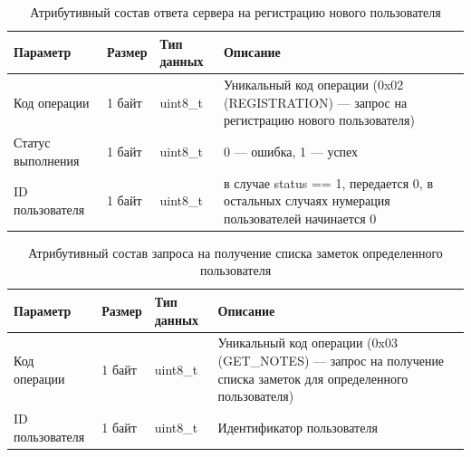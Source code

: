 \begin{table}[H]
    \centering
    \caption{Атрибутивный состав ответа сервера на регистрацию нового пользователя}
    \renewcommand{\arraystretch}{1.2}
    \begin{tabular}{|p{4cm}|p{2.2cm}|p{3cm}|p{6cm}|}
    \hline
    \textbf{Параметр} & \textbf{Размер} & \textbf{Тип данных} & \textbf{Описание} \\ \hline
    Код операции & 1 байт & uint8\_t & Уникальный код операции (0x02 (REGISTRATION) — запрос на регистрацию нового пользователя) \\ \hline
    Статус выполнения & 1 байт & uint8\_t & 0 — ошибка, 1 — успех \\ \hline
    ID пользователя & 1 байт & uint8\_t & в случае status == 1, передается 0, в остальных случаях нумерация пользователей начинается 0 \\ \hline
    \end{tabular}
    \label{tab:auth_response}
\end{table}



\begin{table}[H]
    \centering
    \caption{Атрибутивный состав запроса на получение списка заметок определенного пользователя}
    \begin{tabular}{|p{4cm}|p{2cm}|p{3cm}|p{6cm}|}
    \hline
    \textbf{Параметр} & \textbf{Размер} & \textbf{Тип данных} & \textbf{Описание} \\ \hline
    Код операции & 1 байт & uint8\_t & Уникальный код операции (0x03 (GET\_NOTES) — запрос на получение списка заметок для определенного пользователя) \\ \hline
    ID пользователя & 1 байт & uint8\_t & Идентификатор пользователя \\ \hline
    \end{tabular}
    \label{tab:note_create_request}
\end{table}


